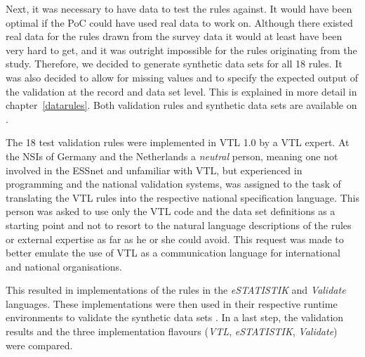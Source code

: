 Next, it was necessary to have data to test the rules against. It would have been
optimal if the PoC could have used real data to work on. Although there existed real
data for the rules drawn from the survey data it would at least have been very hard to get, and
it was outright impossible for the rules originating from the study. Therefore, we
decided to generate synthetic data sets for all 18 rules. It was also decided to
allow for missing values and to specify the expected output of the validation at the
record and data set level. This is explained in more detail in chapter~\ref{datarules}.
Both validation rules and synthetic data sets are available on \citep{GIT:2015}.

The 18 test validation rules were implemented in VTL 1.0 by a VTL expert. At the
NSIs of Germany and the Netherlands a \textit{neutral} person, meaning one not
involved in the ESSnet and unfamiliar with VTL, but experienced in programming
and the national validation systems, was assigned to the task of translating
the VTL rules into the respective national specification language. This person
was asked to use only the VTL code and the data set definitions as a starting
point and not to resort to the natural language descriptions of the rules or
external expertise as far as he or she could avoid. This request was made to
better emulate the use of VTL as a communication language for international
and national organisations.

This resulted in implementations of the rules in the \textit{eSTATISTIK} and
\textit{Validate} languages. These implementations were then used in their
respective runtime environments to validate the synthetic data sets . In a last
step, the validation results and the three implementation flavours (\textit{VTL},
\textit{eSTATISTIK}, \textit{Validate}) were compared.

